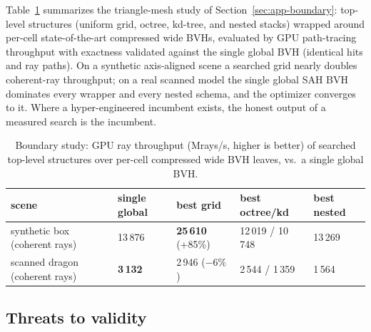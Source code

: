 Table~\ref{tab:boundary} summarizes the triangle-mesh study of Section~\ref{sec:app-boundary}: top-level structures (uniform grid, octree, kd-tree, and nested stacks) wrapped around per-cell state-of-the-art compressed wide BVHs, evaluated by GPU path-tracing throughput with exactness validated against the single global BVH (identical hits and ray paths). On a synthetic axis-aligned scene a searched grid nearly doubles coherent-ray throughput; on a real scanned model the single global SAH BVH dominates every wrapper and every nested schema, and the optimizer converges to it. Where a hyper-engineered incumbent exists, the honest output of a measured search is the incumbent.

\begin{table}[t]
  \centering
  \caption{Boundary study: GPU ray throughput (Mrays/s, higher is better) of searched top-level structures over per-cell compressed wide BVH leaves, vs.\ a single global BVH.}
  \label{tab:boundary}
  \small
  \begin{tabular}{lllll}
    \toprule
    scene & single global & best grid & best octree/kd & best nested \\
    \midrule
    synthetic box (coherent rays) & 13\,876 & \textbf{25\,610} (+85\%) & 12\,019 / 10\,748 & 13\,269 \\
    scanned dragon (coherent rays) & \textbf{3\,132} & 2\,946 ($-6\%$) & 2\,544 / 1\,359 & 1\,564 \\
    \bottomrule
  \end{tabular}
\end{table}

\subsection{Threats to validity}
\label{sec:eval-threats}

